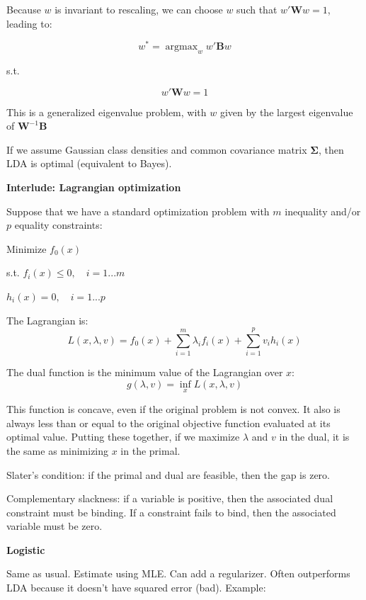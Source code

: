 \documentclass{minimal}
\DeclareMathOperator*{\argmax}{argmax}
\begin{document}
Because $w$ is invariant to rescaling, we can choose $w$ such that
$w'\mathbf{W}w=1$, leading to:

$$
w^* = \argmax_w w'\mathbf{B}w 
$$
\begin{center}
s.t.
\end{center}
$$
w'\mathbf{W}w=1
$$

This is a generalized eigenvalue problem, with $w$ given by the largest
eigenvalue of $\mathbf{W}^{-1}\mathbf{B}$

\smallskip

If we assume Gaussian class densities and common covariance matrix
$\mathbf{\Sigma}$, then LDA is optimal (equivalent to Bayes).

\medskip

\textbf{Interlude: Lagrangian optimization}

Suppose that we have a standard optimization problem with $m$ inequality and/or
$p$ equality constraints:

\smallskip

Minimize $f_0(x)$

s.t. $f_i(x) \leq 0, \quad i=1...m$

$h_i(x)=0, \quad i = 1...p$

The Lagrangian is:
$$
L(x, \lambda, v) = f_0(x) + \sum_{i=1}^m \lambda_if_i(x) + \sum_{i=1}^p v_i
h_i(x)
$$

The dual function is the minimum value of the Lagrangian over $x$:
$$
g(\lambda, v) = \inf_x L(x, \lambda, v)
$$

This function is concave, even if the original problem is not convex. It also is
always less than or equal to the original objective function evaluated at its
optimal value. Putting these together, if we maximize $\lambda$ and $v$ in the dual, it is the same
as minimizing $x$ in the primal.

\smallskip

Slater's condition: if the primal and dual are feasible, then the gap is zero.

\smallskip

Complementary slackness: if a variable is positive, then the associated dual
constraint must be binding. If a constraint fails to bind, then the associated
variable must be zero.

\medskip

\textbf{Logistic}

Same as usual. Estimate using MLE. Can add a regularizer. Often outperforms LDA
because it doesn't have squared error (bad). Example:
\end{document}
